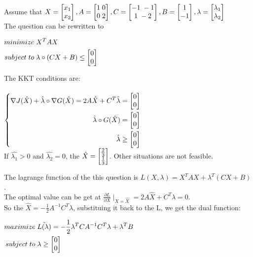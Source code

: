 \documentclass{article}
\newcommand{\p}[2]{\frac{\partial #1}{\partial #2}}
\newcommand{\B}[1]{\left\{\begin{aligned}#1\end{aligned}\right.}
\begin{document}
Assume that
$
\Matrix{X}{x_1 \\ x_2},
\Matrix{A}{1 \; 0 \\ 0 \; 2},
\Matrix{C}{-1 \; -1 \\ 1 \; -2},
\Matrix{B}{1 \\ -1},
\Matrix{\lambda}{\lambda_1 \\ \lambda_2}
$ \\

The question can be rewritten to  \\
\begin{center}
  $
  \begin{aligned}
    minimize \;      &  X^TAX \\
    subject \; to \; & \lambda \circ (CX+B) \le \Matrix{}{0 \\ 0} \\
  \end{aligned}
  $
\end{center}

The KKT conditions are: \\
\\
$
\B{
  \nabla J(\hat{X}) + \hat{\lambda} \circ \nabla G(\hat{X}) = 2A\hat{X} + C^T \hat{\lambda} &= \Matrix{}{0 \\ 0} \\
  \hat{\lambda} \circ G(\hat{X}) &= \Matrix{}{0 \\ 0} \\
  \hat{\lambda} &\ge \Matrix{}{0 \\ 0} \\
}
$
\\

If $\hat{\lambda_1} > 0$ and $\hat{\lambda_2} = 0$, the $\Matrix{\hat{X}}{\frac{2}{3} \\ \frac{1}{3}}$.
Other situations are not feasible.

The lagrange function of the this question is $L(X,\lambda) = X^TAX + \lambda^T(CX+B)$. \\
The optimal value can be get at $\p{L}{X} \mid _ {X=\hat{X}} = 2A\hat{X} + C^T \lambda = 0.$ \\
So the $\hat{X} = - \frac{1}{2} A^{-1} C^T \lambda$, substituing it back to the L, we get the dual function: \\
\begin{center}
  $
  \begin{aligned}
    maximize \;      &  \tilde{L(\lambda)} = - \frac{1}{2} \lambda^T C A^{-1} C^T \lambda + \lambda^TB \\
    subject \; to \; & \lambda \ge \Matrix{}{0 \\ 0} \\
  \end{aligned}
  $
\end{center}
\end{document}
